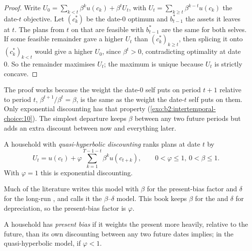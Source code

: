 \begin{proof}
Write $U_0 = \sum_{k<t}\beta^{k}u(c_k) + \beta^{t}U_t$, with $U_t = \sum_{k\ge t}\beta^{k-t}u(c_k)$
the date-$t$ objective. Let $(c^*_k)$ be the date-0 optimum and $b^*_{t-1}$ the assets it leaves at
$t$. The plans from $t$ on that are feasible with $b^*_{t-1}$ are the same for both selves. If some
feasible remainder gave a higher $U_t$ than $(c^*_k)_{k\ge t}$, then splicing it onto
$(c^*_k)_{k<t}$ would give a higher $U_0$, since $\beta^{t} > 0$, contradicting optimality at date 0.
So the remainder maximises $U_t$; the maximum is unique because $U_t$ is strictly concave.
\end{proof}

The proof works because the weight the date-0 self puts on period $t + 1$ relative to period $t$,
$\beta^{t+1}/\beta^{t} = \beta$, is the same as the weight the date-$t$ self puts on them. Only
exponential discounting has that property (\cref{exo:b2:intertemporal-choice:10}). The simplest
departure keeps $\beta$ between any two future periods but adds an extra discount between now and
everything later.

\begin{definition}\label{def:b2:intertemporal-choice:quasi-hyperbolic}
A household with \emph{quasi-hyperbolic discounting} ranks plans at
date $t$ by
\[
U_t = u(c_t) + \varphi\sum_{k=1}^{T-1-t}\beta^{k}u(c_{t+k}), \qquad 0 < \varphi \le 1,\ 0 < \beta \le 1.
\]
With $\varphi = 1$ this is exponential discounting.
\end{definition}

\begin{remark}
Much of the literature writes this model with $\beta$ for the present-bias factor and $\delta$ for the
long-run , and calls it the $\beta$--$\delta$ model. This book keeps $\beta$ for the
 and $\delta$ for depreciation, so the present-bias factor is $\varphi$.
\end{remark}

\begin{definition}\label{def:b2:intertemporal-choice:present-bias}
A household has \emph{present bias} if it weights the present more heavily, relative
to the future, than its own discounting between any two future dates implies; in the quasi-hyperbolic
model, if $\varphi < 1$.
\end{definition}

